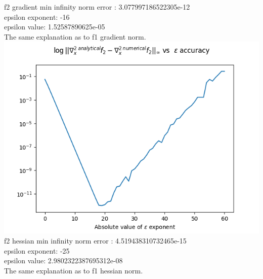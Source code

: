 \documentclass[12pt]{article}
\begin{document}
f2 gradient min infinity norm error : 3.077997186522305e-12\\
epsilon exponent: -16\\
epsilon value: 1.52587890625e-05\\
The same explanation as to f1 gradient norm.\\
\includegraphics[scale=0.7]{f2_hessian_plot}\\
f2 hessian min infinity norm error : 4.519438310732465e-15\\
epsilon exponent: -25\\
epsilon value: 2.9802322387695312e-08\\
The same explanation as to f1 hessian norm.
\end{document}
